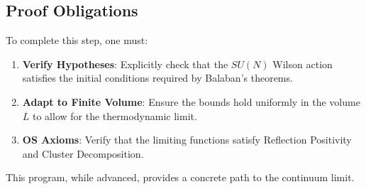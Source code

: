 \subsection{Proof Obligations}

To complete this step, one must:
\begin{enumerate}
    \item \textbf{Verify Hypotheses}: Explicitly check that the $SU(N)$ Wilson action satisfies the initial conditions required by Balaban's theorems.
    \item \textbf{Adapt to Finite Volume}: Ensure the bounds hold uniformly in the volume $L$ to allow for the thermodynamic limit.
    \item \textbf{OS Axioms}: Verify that the limiting functions satisfy Reflection Positivity and Cluster Decomposition.
\end{enumerate}

This program, while advanced, provides a concrete path to the continuum limit.


